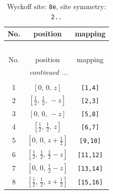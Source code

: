 \documentclass[fleqn,8pt]{jsarticle}
\begin{document}
\renewcommand{\arraystretch}{1.2}
\begin{longtable}{ccc}
\caption{Wyckoff site: {\tt 8e}, site symmetry: {\tt 2..}}
 \\
 \hline \hline
No. & position & mapping \\ \hline \endfirsthead

\multicolumn{2}{l}{\tablename\ \thetable{}} \\
 \hline \hline
No. & position & mapping \\ \hline \endhead

 \hline \hline
\multicolumn{2}{r}{\footnotesize\it continued ...} \\ \endfoot

 \hline \hline
\multicolumn{2}{r}{} \\ \endlastfoot

1 & $\left[ 0,\, 0,\, z \right]$ & {\tt [1,4]} \\ \hline
2 & $\left[ \frac{1}{2},\, \frac{1}{2},\, - z \right]$ & {\tt [2,3]} \\ \hline
3 & $\left[ 0,\, 0,\, - z \right]$ & {\tt [5,8]} \\ \hline
4 & $\left[ \frac{1}{2},\, \frac{1}{2},\, z \right]$ & {\tt [6,7]} \\ \hline
5 & $\left[ 0,\, 0,\, z + \frac{1}{2} \right]$ & {\tt [9,10]} \\ \hline
6 & $\left[ \frac{1}{2},\, \frac{1}{2},\, \frac{1}{2} - z \right]$ & {\tt [11,12]} \\ \hline
7 & $\left[ 0,\, 0,\, \frac{1}{2} - z \right]$ & {\tt [13,14]} \\ \hline
8 & $\left[ \frac{1}{2},\, \frac{1}{2},\, z + \frac{1}{2} \right]$ & {\tt [15,16]} \\
\end{longtable}
\renewcommand{\arraystretch}{1.2}
\end{document}

